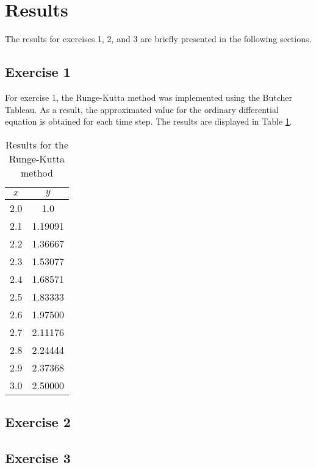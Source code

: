 \section{Results}\label{sec:results}
The results for exercises 1, 2, and 3 are briefly presented in the following sections.

\subsection{Exercise 1}\label{subsec:exercise_1}
For exercise 1, the Runge-Kutta method was implemented using the Butcher Tableau. As a result, the approximated value for the ordinary differential equation is obtained for each time step. The results are displayed in Table \ref{tab:results_ex1}.
\begin{table}[htb!]
    \centering
    \caption{Results for the Runge-Kutta method}
    \begin{tabular}{cc}
        \toprule
        $x$ & $y$ \\
        \midrule
        2.0 & 1.0 \\
        2.1 & 1.19091 \\
        2.2 & 1.36667 \\
        2.3 & 1.53077 \\
        2.4 & 1.68571 \\
        2.5 & 1.83333 \\
        2.6 & 1.97500 \\
        2.7 & 2.11176 \\
        2.8 & 2.24444 \\
        2.9 & 2.37368 \\
        3.0 & 2.50000 \\
        \bottomrule
    \end{tabular}
    \label{tab:results_ex1}
\end{table}

\subsection{Exercise 2}\label{subsec:exercise_2}

\subsection{Exercise 3}\label{subsec:exercise_3}